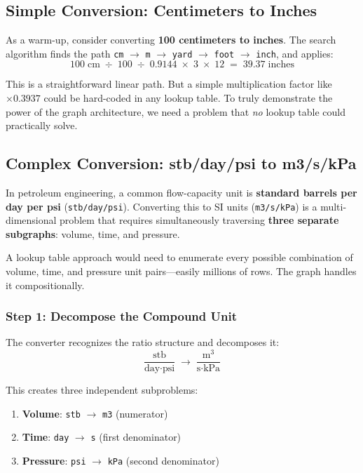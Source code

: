 \documentclass[11pt,a4paper]{report}
\begin{document}
\subsection{Simple Conversion: Centimeters to Inches}

As a warm-up, consider converting \textbf{100 centimeters to inches}. The search algorithm finds the path \texttt{cm} $\rightarrow$ \texttt{m} $\rightarrow$ \texttt{yard} $\rightarrow$ \texttt{foot} $\rightarrow$ \texttt{inch}, and applies:
\[
100 \;\text{cm} \;\div\; 100 \;\div\; 0.9144 \;\times\; 3 \;\times\; 12 \;=\; 39.37 \;\text{inches}
\]

This is a straightforward linear path. But a simple multiplication factor like $\times 0.3937$ could be hard-coded in any lookup table. To truly demonstrate the power of the graph architecture, we need a problem that \emph{no} lookup table could practically solve.

\subsection{Complex Conversion: stb/day/psi to m3/s/kPa}

In petroleum engineering, a common flow-capacity unit is \textbf{standard barrels per day per psi} (\texttt{stb/day/psi}). Converting this to SI units (\texttt{m3/s/kPa}) is a multi-dimensional problem that requires simultaneously traversing \textbf{three separate subgraphs}: volume, time, and pressure.

A lookup table approach would need to enumerate every possible combination of volume, time, and pressure unit pairs---easily millions of rows. The graph handles it compositionally.

\subsubsection{Step 1: Decompose the Compound Unit}

The converter recognizes the ratio structure and decomposes it:
\[
\frac{\text{stb}}{\text{day} \cdot \text{psi}} \;\longrightarrow\; \frac{\text{m}^3}{\text{s} \cdot \text{kPa}}
\]

This creates three independent subproblems:
\begin{enumerate}[leftmargin=*]
  \item \textbf{Volume}: \texttt{stb} $\rightarrow$ \texttt{m3} (numerator)
  \item \textbf{Time}: \texttt{day} $\rightarrow$ \texttt{s} (first denominator)
  \item \textbf{Pressure}: \texttt{psi} $\rightarrow$ \texttt{kPa} (second denominator)
\end{enumerate}
\end{document}

